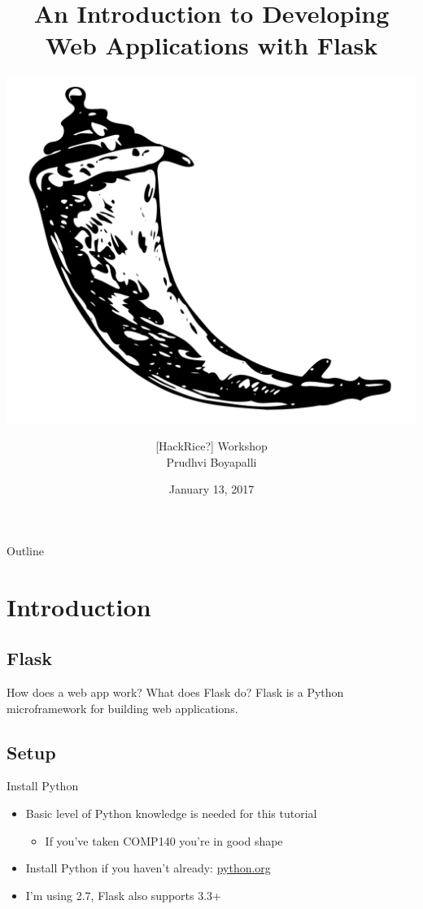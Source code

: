 \documentclass{beamer}
\title[]{An Introduction to Developing Web Applications with Flask}
\subtitle{\vspace{0.25in} \includegraphics[scale=.15]{images/flask-logo.png}}
\author[]{[HackRice?] Workshop \\ Prudhvi Boyapalli}
\date{January 13, 2017}
\begin{document}
\begin{frame}
	\titlepage
\end{frame}

\begin{frame}[t]{Outline}
	\tableofcontents
\end{frame}

\section{Introduction}

\subsection{Flask}
	\begin{frame}[t]{How does a web app work? What does Flask do?}
		Flask is a Python microframework for building web applications.

		\begin{center}
		\end{center}
	\end{frame}


\subsection{Setup}
	\begin{frame}[t]{Install Python}
		\begin{itemize}
			\item{Basic level of Python knowledge is needed for this tutorial}
			\begin{itemize}
				\item{If you've taken COMP140 you're in good shape}
			\end{itemize}

			\item{Install Python if you haven't already: \url{python.org}}

			\item{I'm using 2.7, Flask also supports 3.3+}
		\end{itemize}
	\end{frame}
\end{document}
